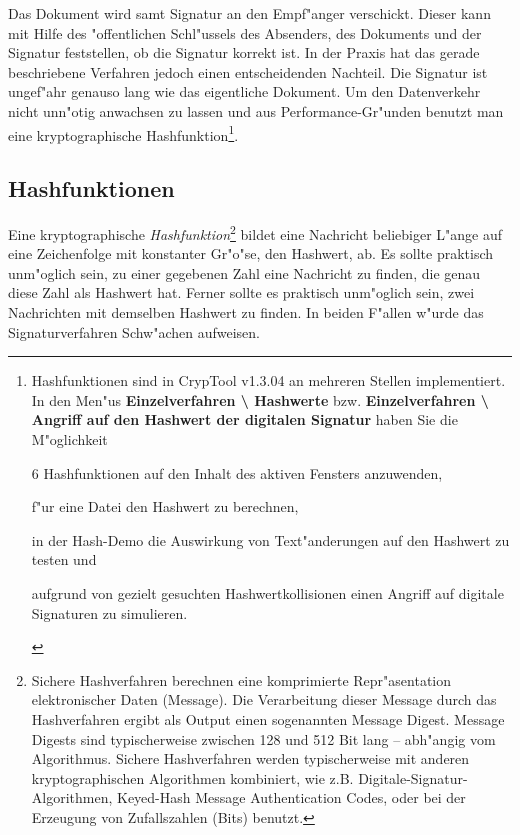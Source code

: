Das Dokument wird samt Signatur an den Empf"anger verschickt. Dieser kann
mit Hilfe des "offentlichen Schl"ussels des Absenders, des Dokuments und
der Signatur feststellen, ob die Signatur korrekt ist.
In der Praxis hat das gerade beschriebene Verfahren jedoch einen
entscheidenden Nachteil. Die Signatur ist ungef"ahr genauso lang wie das
eigentliche Dokument. Um den Datenverkehr nicht unn"otig anwachsen zu
lassen und aus Performance-Gr"unden benutzt man eine
kryptographische Hashfunktion\footnote{%
Hashfunktionen sind in CrypTool v1.3.04
an mehreren Stellen implementiert.\\
In den Men"us {\bf Einzelverfahren \textbackslash{} Hashwerte} bzw.
              {\bf Einzelverfahren \textbackslash{} Angriff auf den Hashwert
	           der digitalen Signatur}
haben Sie die M"oglichkeit
\begin{list}{\textbullet}{\addtolength{\itemsep}{-1.0\baselineskip}}
\item 6 Hashfunktionen auf den Inhalt des aktiven Fensters anzuwenden, \\
\item f"ur eine Datei den Hashwert zu berechnen, \\
\item in der Hash-Demo die Auswirkung von Text"anderungen auf den
      Hashwert zu testen und \\
\item aufgrund von gezielt gesuchten Hashwertkollisionen
      einen Angriff auf digitale Signaturen zu simulieren.
\end{list}
}.


\subsection{Hashfunktionen}
Eine kryptographische  {\em Hashfunktion}\footnote{%
Sichere Hashverfahren berechnen eine komprimierte Repr"asentation elektronischer
Daten (Message).
Die Verarbeitung dieser Message durch das Hashverfahren ergibt als Output
einen sogenannten Message Digest. Message Digests sind typischerweise
zwischen 128 und 512 Bit lang -- abh"angig vom Algorithmus. 
Sichere Hashverfahren werden typischerweise mit anderen kryptographischen
Algorithmen kombiniert, wie z.B. Digitale-Signatur-Algorithmen,
Keyed-Hash Message Authentication Codes, oder bei der Erzeugung von
Zufallszahlen (Bits) benutzt.
}
bildet eine Nachricht beliebiger L"ange auf eine Zeichenfolge mit
konstanter Gr"o"se, den 
Hashwert, ab. Es sollte praktisch unm"oglich sein, zu einer gegebenen Zahl
eine Nachricht zu finden, die genau diese Zahl als Hashwert hat. Ferner
sollte es praktisch unm"oglich sein, zwei Nachrichten mit demselben
Hashwert zu finden. 
In beiden F"allen w"urde das Signaturverfahren Schw"achen aufweisen.

